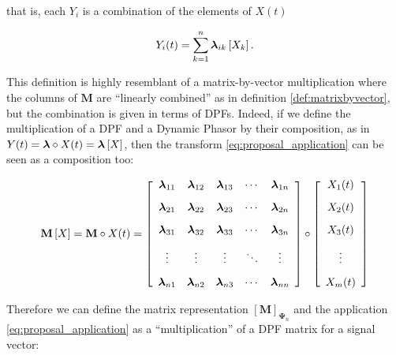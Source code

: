 	\noindent that is, each $Y_i$ is a combination of the elements of $X(t)$

\begin{equation} Y_i(t) = \sum_{k=1}^n \boldsymbol{\lambda}_{ik}\left[X_k\right] .\end{equation}

	This definition is highly resemblant of a matrix-by-vector multiplication where the columns of $\mathbf{M}$ are ``linearly combined'' as in definition \ref{def:matrixbyvector}, but the combination is given in terms of DPFs. Indeed, if we define the multiplication of a DPF and a Dynamic Phasor by their composition, as in $Y(t) = \boldsymbol{\lambda}\circ X(t) = \boldsymbol{\lambda}\left[X\right]$, then the transform \eqref{eq:proposal_application} can be seen as a composition too:

\begin{equation} %
\mathbf{M}\left[X\right] = \mathbf{M}\circ X(t) =
%
\left[\begin{array}{ccccc}
	\dpL_{11} & \dpL_{12} & \dpL_{13} & \cdots & \dpL_{1n} \\[3mm]
	\dpL_{21} & \dpL_{22} & \dpL_{23} & \cdots & \dpL_{2n} \\[3mm]
	\dpL_{31} & \dpL_{32} & \dpL_{33} & \cdots & \dpL_{3n} \\[3mm]
	\vdots    & \vdots    & \vdots    & \ddots & \vdots    \\[3mm]
	\dpL_{n1} & \dpL_{n2} & \dpL_{n3} & \cdots & \dpL_{nn}
\end{array}\right] \circ
%
\left[\begin{array}{c} X_1(t) \\[3mm] X_2(t) \\[3mm] X_3(t) \\[3mm] \vdots \\[3mm] X_m(t) \end{array}\right]
\end{equation}%

	 Therefore we can define the matrix representation $\left[\mathbf{M}\right]_{\boldsymbol{\Psi}_n}$ and the application \eqref{eq:proposal_application} as a ``multiplication'' of a DPF matrix for a signal vector:

